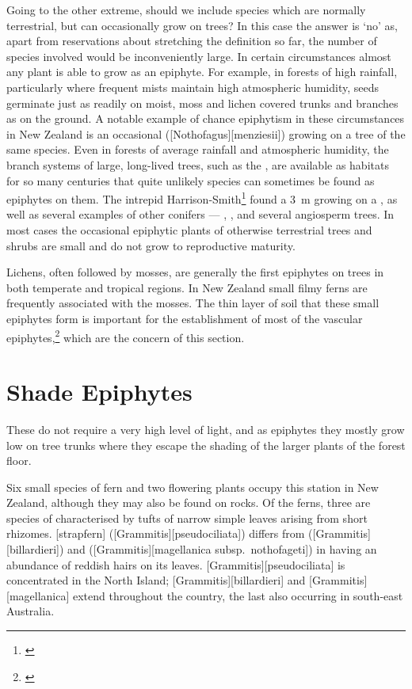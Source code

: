 Going to the other extreme, should we include species which are normally terrestrial, but can occasionally grow on trees? In this case the answer is `no' as, apart from reservations about stretching the definition so far, the number of species involved would be inconveniently large.
In certain circumstances almost any plant is able to grow as an epiphyte.
For example, in forests of high rainfall, particularly where frequent mists maintain high atmospheric humidity, seeds germinate just as readily on moist, moss and lichen covered trunks and branches as on the ground.
A notable example of chance epiphytism in these circumstances in New Zealand is an occasional  ([Nothofagus][menziesii]) growing on a tree of the same species.
Even in forests of average rainfall and atmospheric humidity, the branch systems of large, long-lived trees, such as the , are available as habitats for so many centuries that quite unlikely species can sometimes be found as epiphytes on them.
The intrepid Harrison-Smith\footnote{\cite{harrisonsmith1938kauri}} found a \SI{3}{\metre}  growing on a , as well as several examples of other conifers --- , ,  and several angiosperm trees.
In most cases the occasional epiphytic plants of otherwise terrestrial trees and shrubs are small and do not grow to reproductive maturity.

Lichens, often followed by mosses, are generally the first epiphytes on trees in both temperate and tropical regions.
In New Zealand small filmy ferns are frequently associated with the mosses.
The thin layer of soil that these small epiphytes form is important for the establishment of most of the vascular epiphytes,\footnote{\cite{oliver1930new}} which are the concern of this section.

\section{Shade Epiphytes}

These do not require a very high level of light, and as epiphytes they mostly grow low on tree trunks where they escape the shading of the larger plants of the forest floor.

Six small species of fern and two flowering plants occupy this station in New Zealand, although they may also be found on rocks.
Of the ferns, three are species of  characterised by tufts of narrow simple leaves arising from short rhizomes.
[strapfern] ([Grammitis][pseudociliata]) differs from  ([Grammitis][billardieri]) and  ([Grammitis][magellanica subsp.\ nothofageti]) in having an abundance of reddish hairs on its leaves.
[Grammitis][pseudociliata] is concentrated in the North Island; [Grammitis][billardieri] and [Grammitis][magellanica] extend throughout the country, the last also occurring in south-east Australia.

